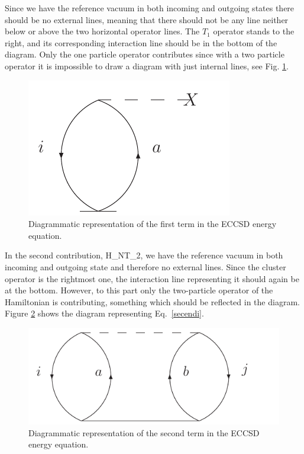 Since we have the reference vacuum in both incoming and outgoing states there
should be no external lines, meaning that there should not be 
any line neither below or above the two horizontal operator 
lines. The $T_1$ operator stands to the right, and its 
corresponding interaction line should be in the bottom of 
the diagram. Only the one particle operator contributes since with a two 
particle operator it is impossible to draw a diagram with just internal 
lines, see Fig. \ref{firstenedi}. 
\begin{figure}[htp]
\centering
\includegraphics[scale=0.75]{firstenedi}
\caption{Diagrammatic representation of the first term in the 
ECCSD energy equation.}
\label{firstenedi}
\end{figure}
In the second contribution,
\be
{}H_NT_2,
\label{secendi}
\ee
we have the reference vacuum in both incoming and outgoing state and therefore no external lines. Since the 
cluster operator is the rightmost one, the interaction line 
representing it should again be at the bottom. However, to this 
part only the two-particle operator of the Hamiltonian is 
contributing, something which should be reflected in the 
diagram. Figure \ref{secndi} shows the diagram representing Eq.~\eqref{secendi}.
\begin{figure}[htp]
\centering
\includegraphics[scale=0.75]{secenedi}
\caption{Diagrammatic representation of the second term in the 
ECCSD energy equation.}
\label{secndi}
\end{figure}
